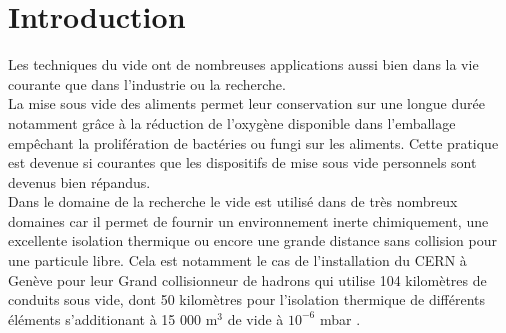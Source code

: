 \section{Introduction}


Les techniques du vide ont de nombreuses applications aussi bien dans la vie courante que dans l'industrie ou la recherche. \\
La mise sous vide des aliments permet leur conservation sur une longue durée notamment grâce à la réduction de l'oxygène disponible dans l'emballage empêchant la prolifération de bactéries ou fungi sur les aliments. Cette pratique est devenue si courantes que les dispositifs de mise sous vide personnels sont devenus bien répandus. \\
Dans le domaine de la recherche le vide est utilisé dans de très nombreux domaines car il permet de fournir un environnement inerte chimiquement, une excellente isolation thermique ou encore une grande distance sans collision pour une particule libre. Cela est notamment le cas de l'installation du CERN à Genève pour leur Grand collisionneur de hadrons qui utilise 104 kilomètres de conduits sous vide, dont 50 kilomètres pour l'isolation thermique de différents éléments s'additionant à 15 000 m\(^{3}\) de vide à \(10^{-6}\) mbar \cite{CERN}.

